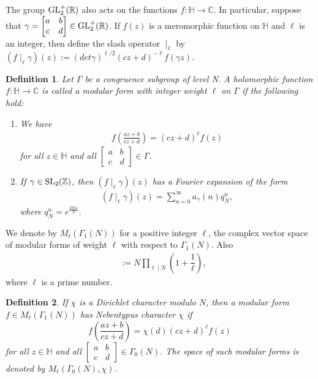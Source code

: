 \documentclass[12pt,reqno]{amsart}
\numberwithin{equation}{section}
\newtheorem{definition}{Definition}[section]
\begin{document}
The group $\textup{GL}_2^{+}(\mathbb{R})$ also acts on the functions $f : \mathbb{H} \to \mathbb{C}$. In particular, suppose that $\gamma = \begin{bmatrix}
a  &  b \\
c  &  d      
\end{bmatrix} \in \textup{GL}_2^{+}(\mathbb{R}) $. If $f(z)$ is a meromorphic function on $\mathbb{H}$ and $\ell$ is an integer, then define the slash operator $\mid_{\ell}$ by 
$(f\mid_{\ell}\gamma )(z) := (det \gamma)^{\ell/2}(cz+d)^{-\ell}f(\gamma z)$.\\

\begin{definition}
Let $\Gamma$ be a congruence subgroup of level N. A holomorphic function $f : \mathbb{H} \to \mathbb{C}$ is called a modular form with integer weight $\ell$ on $\Gamma$ if the following hold:
\begin{enumerate}
    \item We have
    \begin{align*}
        f\left(\frac{az+b}{cz+d}\right)=(cz+d)^{\ell}f(z)
    \end{align*}
    for all $z\in\mathbb{H}$ and all $\begin{bmatrix}
        a&b\\
        c&d
    \end{bmatrix}\in\Gamma$.
    \item If $\gamma\in\textup{SL}_2(\mathbb{Z})$, then $(f\mid_{\ell}\gamma )(z)$ has a Fourier expansion of the form
    \begin{align*}
        (f\mid_{\ell}\gamma )(z)=\sum_{n=0}^{\infty}a_{\gamma}(n)q^n_{N},
    \end{align*}
    where $q^n_{N}=e^{\frac{2\pi iz}{N}}$.
\end{enumerate}
\end{definition}

We denote by $M_\ell(\Gamma_1(N))$ for a positive integer $\ell$, the complex vector space of modular forms of weight $\ell$ with respect to $\Gamma_1(N)$. Also
\begin{align*}
[\Gamma : \Gamma_0(N)]&:=N\prod_{\ell\mid N} \left( 1+\dfrac{1}{\ell}\right),
\end{align*}
where $\ell$ is a prime number.
\begin{definition}\cite[Definition 1.15]{OnoModularity}
    If $\chi$ is a Dirichlet character modulo $N$, then a modular form $f\in M_\ell(\Gamma_1(N))$ has Nebentypus character $\chi$ if 
    $$f\left( \frac{az+b}{cz+d}\right)=\chi(d)(cz+d)^{\ell}f(z)$$ for all $z\in \mathbb{H}$ and all $\begin{bmatrix}
a  &  b \\
c  &  d      
\end{bmatrix}\in \Gamma_0(N)$. The space of such modular forms is denoted by $M_\ell(\Gamma_0(N),\chi)$.
\end{definition}
\end{document}
